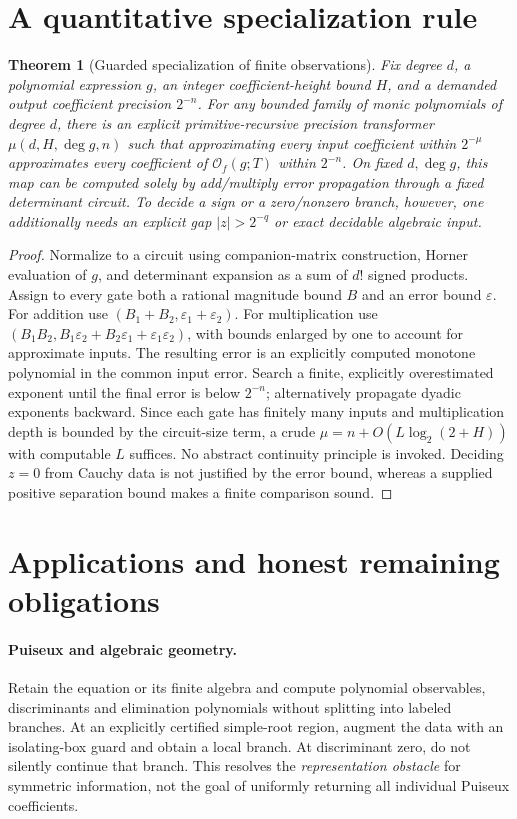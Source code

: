 \documentclass[11pt]{article}
\newtheorem{theorem}{Theorem}[section]
\begin{document}
\section{A quantitative specialization rule}
\begin{theorem}[Guarded specialization of finite observations]
Fix degree \(d\), a polynomial expression \(g\), an integer coefficient-height bound \(H\), and a demanded output coefficient precision \(2^{-n}\). For any bounded family of monic polynomials of degree \(d\), there is an explicit primitive-recursive precision transformer \(\mu(d,H,\deg g,n)\) such that approximating every input coefficient within \(2^{-\mu}\) approximates every coefficient of \(\mathcal O_f(g;T)\) within \(2^{-n}\). On fixed \(d,\deg g\), this map can be computed solely by add/multiply error propagation through a fixed determinant circuit. To decide a sign or a zero/nonzero branch, however, one additionally needs an explicit gap \(|z|>2^{-q}\) or exact decidable algebraic input.
\end{theorem}
\begin{proof}
Normalize to a circuit using companion-matrix construction, Horner evaluation of \(g\), and determinant expansion as a sum of \(d!\) signed products. Assign to every gate both a rational magnitude bound \(B\) and an error bound \(\varepsilon\). For addition use \((B_1+B_2,\varepsilon_1+\varepsilon_2)\). For multiplication use \((B_1B_2, B_1\varepsilon_2+B_2\varepsilon_1+\varepsilon_1\varepsilon_2)\), with bounds enlarged by one to account for approximate inputs. The resulting error is an explicitly computed monotone polynomial in the common input error. Search a finite, explicitly overestimated exponent until the final error is below \(2^{-n}\); alternatively propagate dyadic exponents backward. Since each gate has finitely many inputs and multiplication depth is bounded by the circuit-size term, a crude \(\mu=n+O(L\log_2(2+H))\) with computable \(L\) suffices. No abstract continuity principle is invoked. Deciding \(z=0\) from Cauchy data is not justified by the error bound, whereas a supplied positive separation bound makes a finite comparison sound.
\end{proof}

\section{Applications and honest remaining obligations}
\paragraph{Puiseux and algebraic geometry.} Retain the equation or its finite algebra and compute polynomial observables, discriminants and elimination polynomials without splitting into labeled branches. At an explicitly certified simple-root region, augment the data with an isolating-box guard and obtain a local branch. At discriminant zero, do not silently continue that branch. This resolves the \emph{representation obstacle} for symmetric information, not the goal of uniformly returning all individual Puiseux coefficients.
\end{document}
